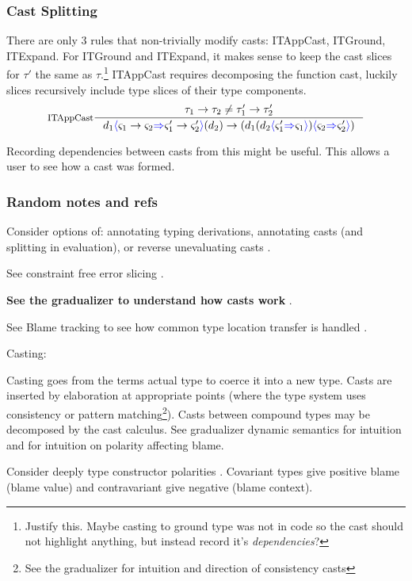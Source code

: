 \subsubsection{Cast Splitting}
There are only 3 rules that non-trivially modify casts: ITAppCast, ITGround, ITExpand. For ITGround and  ITExpand, it makes sense to keep the cast slices for $\tau'$ the same as $\tau$.\footnote{Justify this. Maybe casting to ground type was not in code so the cast should not highlight anything, but instead record it's \textit{dependencies}?} ITAppCast requires decomposing the function cast, luckily slices recursively include type slices of their  type components.
\[\inference[ITAppCast]{\tau_1 \to \tau_2 \neq \tau_1' \to \tau_2'}{d_1\scast{\varsigma_1 \to \varsigma_2}{\varsigma_1' \to \varsigma_2'}(d_2) \to (d_1(d_2\scast{\varsigma_1'}{\varsigma_1})\scast{\varsigma_2}{\varsigma_2'})}\]

\par 

Recording dependencies between casts from this might be useful. This allows a user to see how a cast was formed.


\subsubsection{Random notes and refs}
Consider options of: annotating typing derivations, annotating casts (and splitting in evaluation), or reverse unevaluating casts \cite{FunctionalProgExplain}.\par
See constraint free error slicing \cite{ConstraintFreeErrSlice}.\par
\textbf{See the gradualizer to understand how casts work }\cite{Gradualizer}.\par
See Blame tracking to see how common type location transfer is handled \cite{Blame}.\\ \par
Casting:\par 
Casting goes from the terms actual type to coerce it into a new type. Casts are inserted by elaboration at appropriate points (where the type system uses consistency or pattern matching\footnote{See the gradualizer for intuition and direction of consistency casts}). Casts between compound types may be decomposed by the cast calculus. See gradualizer dynamic semantics \cite{GradualizerDynamic} for intuition and \cite{Blame} for intuition on polarity affecting blame. \par 
Consider deeply type constructor polarities \cite[pg.~473]{TAPL}. Covariant types give positive blame (blame value) and contravariant give negative (blame context).


